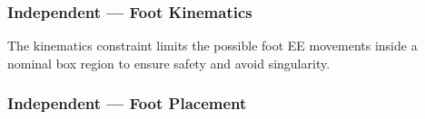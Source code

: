 
\subsubsection{Independent --- \textbf{Foot Kinematics}}
The kinematics constraint limits the possible foot EE movements inside a nominal box region to ensure safety and avoid singularity.

\subsubsection{Independent --- \textbf{Foot Placement}}

